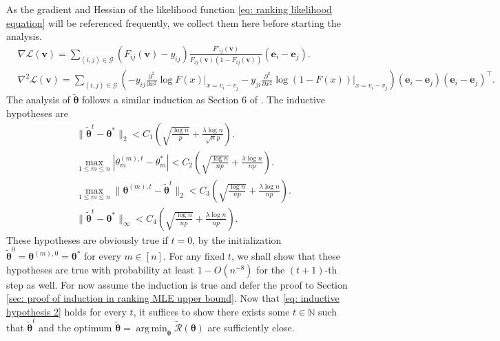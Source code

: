 \documentclass[letterpaper,12pt]{article}
\numberwithin{equation}{section}
\theoremstyle{plain}
\numberwithin{Theorem}{section}
\numberwithin{corollary}{section}
\numberwithin{proposition}{section}
\numberwithin{Lemma}{section}
{
	\theoremstyle{definition}
	\newtheorem{Definition}{Definition}
	\newtheorem{example}{Example}
	\numberwithin{example}{section}
	\newtheorem{fact}{Fact}
	\numberwithin{fact}{section}
	\newtheorem{remark}{Remark}
}
\newcommand{\1}{\mathbbm{1}}
\def\bth{{\boldsymbol{\theta}}}
\DeclareMathOperator*{\argmin}{arg\,min}
\begin{document}
As the gradient and Hessian of the likelihood function \eqref{eq: ranking likelihood equation} will be referenced frequently, we collect them here before starting the analysis.
\begin{align}
	&\nabla \mathcal L(\bm v) = \sum_{(i, j) \in \mathcal G} (F_{ij}(\bm v) - y_{ij})\frac{F'_{ij}(\bm v)}{F_{ij}(\bm v)(1 - F_{ij}(\bm v))}(\bm e_i - \bm e_j). \label{eq: likelihood gradient}\\
	&\nabla^2 \mathcal L(\bm v) =  \sum_{(i, j) \in \mathcal G} \left(-y_{ij}\frac{\partial^2}{\partial x^2}\log F(x)\Big|_{x = v_i  - v_j} - y_{ji}\frac{\partial^2}{\partial x^2}\log (1-F(x))\Big|_{x = v_i  - v_j}\right)(\bm e_i - \bm e_j) (\bm e_i - \bm e_j)^\top. \label{eq: likelihood hessian}
\end{align}
The analysis of $\widetilde \bth$ follows a similar induction as Section 6 of \cite{chen2019spectral}. The inductive hypotheses are
\begin{align}
	&\|\widetilde\bth^t - \bth^*\|_2 < C_1\left(\sqrt{\frac{\log n}{p}} + \frac{\lambda\log n}{\sqrt{n}p}\right). \label{eq: inductive hypothesis 1}\\
	& \max_{1 \leq m \leq n} |\theta^{(m), t}_m - \theta^*_m| < C_2 \left(\sqrt{\frac{\log n}{np}} + \frac{\lambda\log n}{np}\right). \label{eq: inductive hypothesis 3}\\
	&\max_{1 \leq m \leq n}\|\bth^{(m), t} - \widetilde\bth^t\|_2 < C_3\left(\sqrt{\frac{\log n}{np}} + \frac{\lambda\log n}{np}\right). \label{eq: inductive hypothesis 4}\\
	&\|\widetilde\bth^t - \bth^*\|_\infty < C_4\left(\sqrt{\frac{\log n}{np}} + \frac{\lambda\log n}{np}\right). \label{eq: inductive hypothesis 2}
\end{align}
These hypotheses are obviously true if $t = 0$, by the initialization $\widetilde \bth^0 = \bth^{(m), 0} = \bth^*$ for every $m \in [n]$. For any fixed $t$, we shall show that these hypotheses are true with probability at least $1 - O(n^{-8})$ for the $(t+1)$-th step as well. For now assume the induction is true and defer the proof to Section \ref{sec: proof of induction in ranking MLE upper bound}. Now that \eqref{eq: inductive hypothesis 2} holds for every $t$, it suffices to show there exists some $t \in \mathbb N$ such that $\widetilde\bth^t$ and the optimum $\widetilde\bth = \argmin_\bth \widetilde {\mathcal R}(\bth)$ are sufficiently close.
\end{document}
